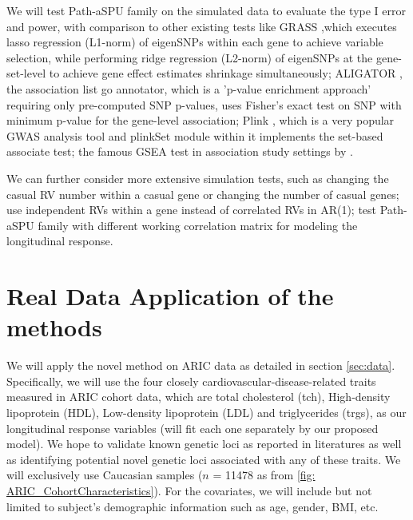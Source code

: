 \documentclass[12pt]{article}
\begin{document}
We will test Path-aSPU family on the simulated data to evaluate the type I error and power, with comparison to other existing tests like GRASS \cite{Chen2010},which executes lasso regression (L1-norm) of eigenSNPs within each gene to achieve variable selection, while performing ridge regression (L2-norm) of eigenSNPs at the gene-set-level to achieve gene effect estimates shrinkage simultaneously; ALIGATOR \cite{Holmans2009}, the association list go annotator, which is a 'p-value enrichment approach' requiring only pre-computed SNP p-values, uses Fisher's exact test on SNP with minimum p-value for the gene-level association; Plink \cite{Purcell2007}, which is a very popular GWAS analysis tool and plinkSet module within it implements the set-based associate test; the famous GSEA test in association study settings by \cite{wang2007pathway}.

We can further consider more extensive simulation tests, such as changing the casual RV number within a casual gene or changing the number of casual genes; use independent RVs within a gene instead of correlated RVs in AR(1); test Path-aSPU family with different working correlation matrix for modeling the longitudinal response. 


\section{Real Data Application of the methods}\label{sec:subsub1-3}
\label{sec:Data Application}
We will apply the novel method on ARIC data as detailed in section \ref{sec:data}. Specifically, we will use the four closely cardiovascular-disease-related traits measured in ARIC cohort data, which are total cholesterol (tch), High-density lipoprotein (HDL), Low-density lipoprotein (LDL) and triglycerides (trgs), as our longitudinal response variables (will fit each one separately by our proposed model). We hope to validate known genetic loci as reported in literatures \cite{Teslovich2010,Lange2014,Peloso2014,Consortium2013,Maxwell2013} as well as identifying potential novel genetic loci associated with any of these traits. We will exclusively use Caucasian samples ($n$ = 11478 as from \ref{fig: ARIC_CohortCharacteristics}). For the covariates, we will include but not limited to subject's demographic information such as age, gender, BMI, etc. 
\end{document}
